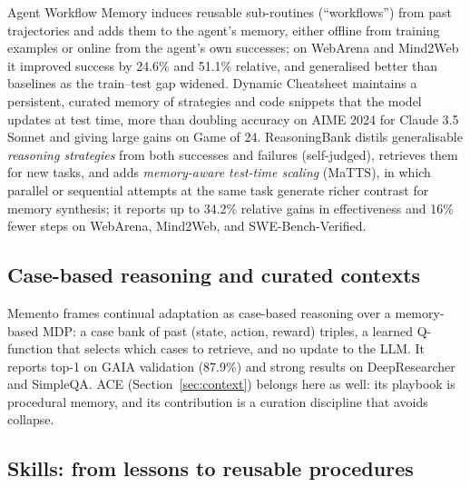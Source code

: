 \documentclass[11pt]{article}
\begin{document}
Agent Workflow Memory \citep{wang2024awm} induces reusable sub-routines (``workflows'') from past trajectories and adds them to the agent's memory, either offline from training examples or online from the agent's own successes; on WebArena and Mind2Web it improved success by 24.6\% and 51.1\% relative, and generalised better than baselines as the train--test gap widened. Dynamic Cheatsheet \citep{suzgun2025cheatsheet} maintains a persistent, curated memory of strategies and code snippets that the model updates at test time, more than doubling accuracy on AIME 2024 for Claude 3.5 Sonnet and giving large gains on Game of 24. ReasoningBank \citep{ouyang2025reasoningbank} distils generalisable \emph{reasoning strategies} from both successes and failures (self-judged), retrieves them for new tasks, and adds \emph{memory-aware test-time scaling} (MaTTS), in which parallel or sequential attempts at the same task generate richer contrast for memory synthesis; it reports up to 34.2\% relative gains in effectiveness and 16\% fewer steps on WebArena, Mind2Web, and SWE-Bench-Verified.

\subsection{Case-based reasoning and curated contexts}

Memento \citep{zhou2025memento} frames continual adaptation as case-based reasoning over a memory-based MDP: a case bank of past (state, action, reward) triples, a learned Q-function that selects which cases to retrieve, and no update to the LLM. It reports top-1 on GAIA validation (87.9\%) and strong results on DeepResearcher and SimpleQA. ACE (Section~\ref{sec:context}) belongs here as well: its playbook is procedural memory, and its contribution is a curation discipline that avoids collapse.

\subsection{Skills: from lessons to reusable procedures}
\end{document}
